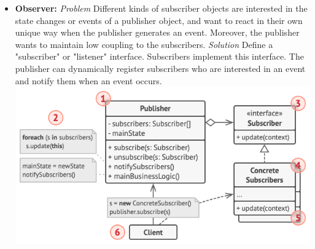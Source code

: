 \begin{itemize}
    \item \textbf{Observer:} \textit{Problem} Different kinds of subscriber objects are interested in the state changes or events of a publisher object, and want to react in their own unique way when the publisher generates an event. Moreover, the publisher wants to maintain low coupling to the subscribers.
    \textit{Solution} Define a "subscriber" or "listener" interface. Subscribers implement this interface. The publisher can dynamically register subscribers who are interested in an event and notify them when an event occurs.\\
    \includegraphics[width=\linewidth]{figs/observer.png}\\
\end{itemize}